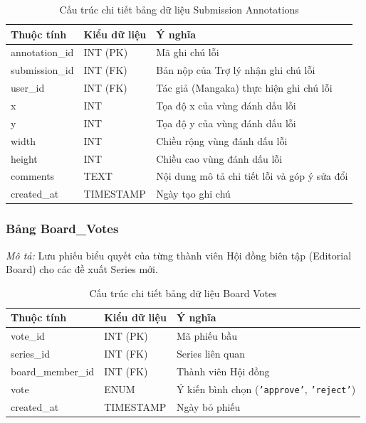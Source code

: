 \noindent
\begin{table}[H]
\centering
\renewcommand{\arraystretch}{1.3}
\begin{tabularx}{\textwidth}{|p{4cm}|p{3cm}|>{\raggedright\arraybackslash}X|}
\hline
\rowcolor{tableheader}
\textbf{Thuộc tính} & \textbf{Kiểu dữ liệu} & \textbf{Ý nghĩa} \\ \hline
annotation\_id & INT (PK) & Mã ghi chú lỗi \\ \hline
submission\_id & INT (FK) & Bản nộp của Trợ lý nhận ghi chú lỗi \\ \hline
user\_id & INT (FK) & Tác giả (Mangaka) thực hiện ghi chú lỗi \\ \hline
x & INT & Tọa độ x của vùng đánh dấu lỗi \\ \hline
y & INT & Tọa độ y của vùng đánh dấu lỗi \\ \hline
width & INT & Chiều rộng vùng đánh dấu lỗi \\ \hline
height & INT & Chiều cao vùng đánh dấu lỗi \\ \hline
comments & TEXT & Nội dung mô tả chi tiết lỗi và góp ý sửa đổi \\ \hline
created\_at & TIMESTAMP & Ngày tạo ghi chú \\ \hline
\end{tabularx}
\caption{Cấu trúc chi tiết bảng dữ liệu Submission Annotations}
\label{tab:db_submission_annotations}
\end{table}
\vspace{0.5cm}
\vspace{0.5cm}

\subsubsection{Bảng Board\_Votes}
\label{subsubsec:tbl_board_votes}
\textit{Mô tả:} Lưu phiếu biểu quyết của từng thành viên Hội đồng biên tập (Editorial Board) cho các đề xuất Series mới.

\noindent
\begin{table}[H]
\centering
\renewcommand{\arraystretch}{1.3}
\begin{tabularx}{\textwidth}{|p{4cm}|p{3cm}|>{\raggedright\arraybackslash}X|}
\hline
\rowcolor{tableheader}
\textbf{Thuộc tính} & \textbf{Kiểu dữ liệu} & \textbf{Ý nghĩa} \\ \hline
vote\_id & INT (PK) & Mã phiếu bầu \\ \hline
series\_id & INT (FK) & Series liên quan \\ \hline
board\_member\_id & INT (FK) & Thành viên Hội đồng \\ \hline
vote & ENUM & Ý kiến bình chọn (\texttt{'approve'}, \texttt{'reject'}) \\ \hline
created\_at & TIMESTAMP & Ngày bỏ phiếu \\ \hline
\end{tabularx}
\caption{Cấu trúc chi tiết bảng dữ liệu Board Votes}
\label{tab:db_board_votes}
\end{table}
\vspace{0.5cm}


